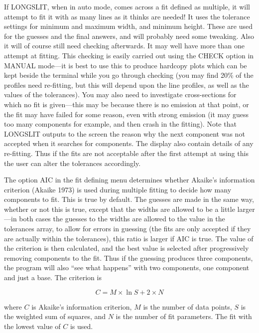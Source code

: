 If LONGSLIT, when in auto mode, comes across a fit defined as
multiple, it will attempt to fit it with as many lines as it thinks
are needed!  It uses the tolerance settings for minimum and maximum
width, and minimum height.  These are used for the guesses and the
final answers, and will probably need some tweaking.  Also it will of
course still need checking afterwards.  It may well have more than one
attempt at fitting. This checking is easily carried out using the
CHECK option in MANUAL mode---it is best to use this to produce
hardcopy plots which can be kept beside the terminal while you go
through checking (you may find 20\% of the profiles need re-fitting,
but this will depend upon the line profiles, as well as the values of
the tolerances). You may also need to investigate cross-sections for
which no fit is given---this may be because there is no emission at
that point, or the fit may have failed for some reason, even with
strong emission (it may guess too many components for example, and
then crash in the fitting).  Note that LONGSLIT outputs to the screen
the reason why the next component was not accepted when it searches
for components. The display also contain details of any re-fitting.
Thus if the fits are not acceptable after the first attempt at using
this the user can alter the tolerances accordingly.  

The option AIC in the fit defining menu determines whether Akaike's
information criterion (Akaike 1973) is used during multiple
fitting to decide how many components to fit.  This is true by
default.  The guesses are made in the same way, whether or not this is
true, except that the widths are allowed to be a little larger---in
both cases the guesses to the widths are allowed to the value in the
tolerances array, to allow for errors in guessing (the fits are only
accepted if they are actually within the tolerances), this ratio is
larger if AIC is true.  The value of the criterion is then calculated,
and the best value is selected after progressively removing components
to the fit.  Thus if the guessing produces three components, the
program will also ``see what happens'' with two components, one
component and just a base. The criterion is

\begin{equation}
C = M \times \ln S + 2 \times N
\end{equation}

where $C$ is Akaike's information criterion, $M$ is the number of data
points, $S$ is the weighted sum of squares, and $N$ is the number of fit
parameters.
The fit with the lowest value of $C$ is used.

